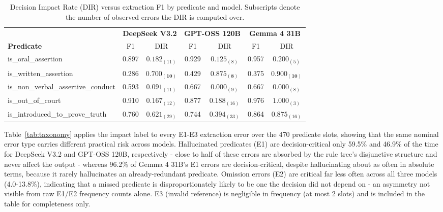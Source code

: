 \begin{table}[htbp]
\centering
\small
\caption{Decision Impact Rate (DIR) versus extraction F1 by predicate and model. Subscripts denote the number of observed errors the DIR is computed over.}
\label{tab:dir}
\begin{tabular}{lcccccc}
\toprule
& \multicolumn{2}{c}{\textbf{DeepSeek V3.2}} & \multicolumn{2}{c}{\textbf{GPT-OSS 120B}} & \multicolumn{2}{c}{\textbf{Gemma 4 31B}} \\
\textbf{Predicate} & F1 & DIR & F1 & DIR & F1 & DIR \\
\midrule
is\_oral\_assertion                 & 0.897 & $0.182_{(11)}$ & 0.929 & $0.125_{(8)}$  & 0.957 & $0.200_{(5)}$  \\
is\_written\_assertion              & 0.286 & $\mathbf{0.700_{(10)}}$ & 0.429 & $\mathbf{0.875_{(8)}}$  & 0.375 & $\mathbf{0.900_{(10)}}$ \\
is\_non\_verbal\_assertive\_conduct & 0.593 & $0.091_{(11)}$ & 0.667 & $0.000_{(9)}$  & 0.667 & $0.000_{(8)}$  \\
is\_out\_of\_court                  & 0.910 & $0.167_{(12)}$ & 0.877 & $0.188_{(16)}$ & 0.976 & $1.000_{(3)}$  \\
is\_introduced\_to\_prove\_truth    & 0.760 & $0.621_{(29)}$ & 0.744 & $0.394_{(33)}$ & 0.864 & $0.875_{(16)}$ \\
\bottomrule
\end{tabular}
\end{table}

Table~\ref{tab:taxonomy} applies the impact label to every E1-E3 extraction error over the 470 predicate slots, showing that the same nominal error type carries different practical risk across models. Hallucinated predicates (E1) are decision-critical only 59.5\% and 46.9\% of the time for DeepSeek V3.2 and GPT-OSS 120B, respectively - close to half of these errors are absorbed by the rule tree's disjunctive structure and never affect the output - whereas 96.2\% of Gemma 4 31B's E1 errors are decision-critical, despite hallucinating about as often in absolute terms, because it rarely hallucinates an already-redundant predicate. Omission errors (E2) are critical far less often across all three models (4.0-13.8\%), indicating that a missed predicate is disproportionately likely to be one the decision did not depend on - an asymmetry not visible from raw E1/E2 frequency counts alone. E3 (invalid reference) is negligible in frequency (at most 2 slots) and is included in the table for completeness only.

